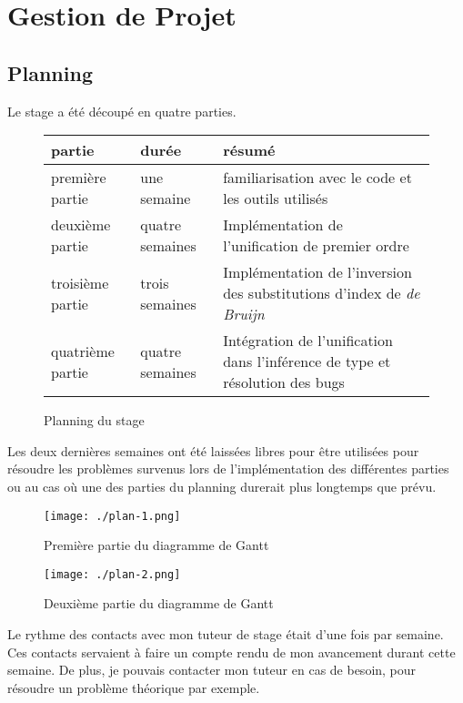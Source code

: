 \chapter{Gestion de Projet}

\section{Planning}

Le stage a été découpé en quatre parties.

\begin{figure}[!h]
    \centering
    \caption{Planning du stage}
\label{tab:plan}
    \begin{tabular}{|l | l | l |}
        \toprule
        partie & durée & résumé \\
        \midrule
        première partie & une semaine & familiarisation avec le code et les outils utilisés\\
        \midrule
        deuxième partie & quatre semaines & Implémentation de l'unification de premier ordre\\
        \midrule
        troisième partie & trois semaines & Implémentation de l'inversion des substitutions d'index de \textit{de Bruijn}\\
        \midrule
        quatrième partie & quatre semaines & Intégration de l'unification dans l'inférence de type et résolution des bugs\\
        \bottomrule
    \end{tabular}
\end{figure}

Les deux dernières semaines ont été laissées libres pour être utilisées pour résoudre les problèmes survenus lors de
l'implémentation des différentes parties ou au cas où une des parties du planning durerait plus longtemps que prévu.
\begin{figure}[!h]
    \centering
    \texttt{[image: ./plan-1.png]}
    \caption{Première partie du diagramme de Gantt}
\label{fig:gant1}
\end{figure}
\begin{figure}[!h]
    \centering
    \texttt{[image: ./plan-2.png]}
    \caption{Deuxième partie du diagramme de Gantt}
\label{fig:gant2}
\end{figure}
Le rythme des contacts avec mon tuteur de stage était d'une fois par semaine. Ces contacts servaient à
faire un compte rendu de mon avancement durant cette semaine.
De plus, je pouvais contacter mon tuteur en cas de besoin, pour résoudre un problème théorique par exemple.


